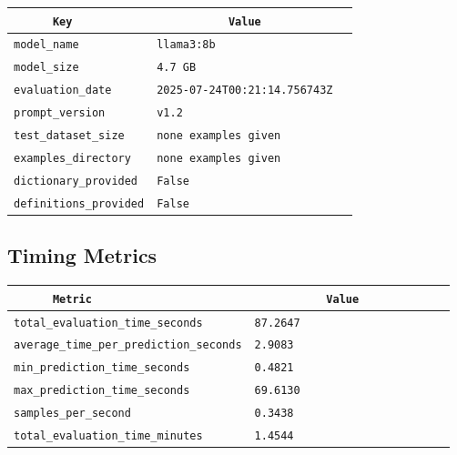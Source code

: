 \documentclass{article}
\begin{document}
\begin{center}
\begin{tabular}{l | l} \hline
    \verb|      Key      | & \verb|           Value           | \\ \hline
    \hline
    \verb|model_name    | & \verb|llama3:8b                    | \\ \hline
    \verb|model_size    | & \verb|4.7 GB                       | \\ \hline
    \verb|evaluation_date| & \verb|2025-07-24T00:21:14.756743Z  | \\ \hline
    \verb|prompt_version| & \verb|v1.2                         | \\ \hline
    \verb|test_dataset_size| & \verb|none examples given          | \\ \hline
    \verb|examples_directory| & \verb|none examples given          | \\ \hline
    \verb|dictionary_provided| & \verb|False                        | \\ \hline
    \verb|definitions_provided| & \verb|False                        | \\ \hline
\end{tabular}
\end{center}

\subsection{Timing Metrics}

\begin{center}
\begin{tabular}{l | l} \hline
    \verb|      Metric     | & \verb|           Value           | \\ \hline
    \hline
    \verb|total_evaluation_time_seconds| & \verb|87.2647                      | \\ \hline
    \verb|average_time_per_prediction_seconds| & \verb|2.9083                       | \\ \hline
    \verb|min_prediction_time_seconds| & \verb|0.4821                       | \\ \hline
    \verb|max_prediction_time_seconds| & \verb|69.6130                      | \\ \hline
    \verb|samples_per_second| & \verb|0.3438                       | \\ \hline
    \verb|total_evaluation_time_minutes| & \verb|1.4544                       | \\ \hline
\end{tabular}
\end{center}
\end{document}
